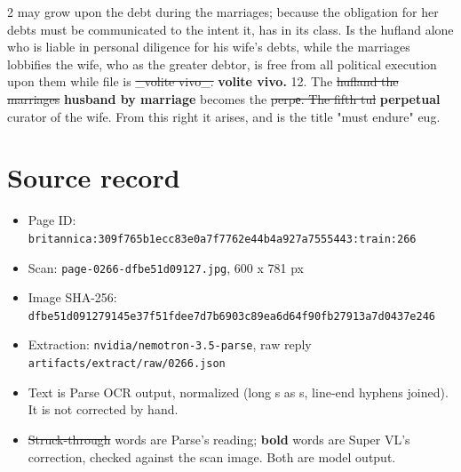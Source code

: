 \documentclass[10pt]{article}
\begin{document}
\begin{multicols}{2}
may grow upon the debt during the marriages; because the obligation for her debts must be communicated to the intent it, has in its class. Is the hufland alone who is liable in personal diligence for his wife’s debts, while the marriages lobbifies the wife, who as the greater debtor, is free from all political execution upon them while file is \sout{\_volite vivo\_.} \textbf{volite vivo.} 12. The \sout{hufland the marriages} \textbf{husband by marriage} becomes the \sout{perpе. The fifth tul} \textbf{perpetual} curator of the wife. From this right it arises, and is the title "must endure" eug.
\end{multicols}
\section*{Source record}
\begin{itemize}
\item Page ID: \texttt{britannica:309f765b1ecc83e0a7f7762e44b4a927a7555443:train:266}
\item Scan: \texttt{page-0266-dfbe51d09127.jpg}, 600 x 781 px
\item Image SHA-256: \texttt{\small dfbe51d091279145e37f51fdee7d7b6903c89ea6d64f90fb27913a7d0437e246}
\item Extraction: \texttt{nvidia/nemotron-3.5-parse}, raw reply \texttt{artifacts/extract/raw/0266.json}
\item Text is Parse OCR output, normalized (long s as s, line-end hyphens joined). It is not corrected by hand.
\item \sout{Struck-through} words are Parse's reading; \textbf{bold} words are Super VL's correction, checked against the scan image. Both are model output.
\end{itemize}
\end{document}
